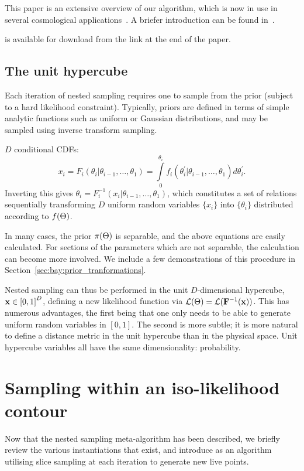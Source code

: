 This paper is an extensive overview of our algorithm, which is now in use in several cosmological applications~\citep{planck2015-a24}. A briefer introduction can be found in~\cite{polychordletter}.

\PolyChord{} is available for download from the link at the end of the paper.


\subsection{The unit hypercube}
\label{sec:bay:unit_hypercube}
Each iteration of nested sampling requires one to sample from the prior (subject to a hard likelihood constraint). 
Typically, priors are defined in terms of simple analytic functions such as uniform or Gaussian distributions, and may be sampled using  inverse transform sampling. 

$D$ conditional CDFs:
%
\begin{equation}
  x_i = F_i(\theta_i|\theta_{i-1},\ldots,\theta_1) = \int\limits_0^{\theta_i} f_i(\theta_i^\prime|\theta_{i-1},\ldots,\theta_1) d\theta_i^\prime.
\end{equation}
%
Inverting this gives $\theta_i = F^{-1}_i(x_i|\theta_{i-1},\ldots,\theta_1)$, which constitutes a set of relations sequentially transforming $D$ uniform random variables $\{x_i\}$ into $\{\theta_i\}$ distributed according to $f(\Theta)$.

In many cases, the prior $\pi(\Theta)$ is separable, and the above equations are easily calculated. For sections of the parameters which are not separable, the calculation can become more involved. We include a few demonstrations of this procedure in Section~\ref{sec:bay:prior_tranformations}.

Nested sampling can thus be performed in the unit $D$-dimensional hypercube, $\mathbf{x}\in {[0,1]}^D$, defining a new likelihood function via $\mathcal{L}(\Theta)= \mathcal{L}(\mathbf{F}^{-1}(\mathbf{x}))$. This has numerous advantages, the first being that one only needs to be able to generate uniform random variables in $[0,1]$. The second is more subtle; it is more natural to define a distance metric in the unit hypercube than in the physical space. Unit hypercube variables all have the same dimensionality: probability.












\section{Sampling within an iso-likelihood contour}
\label{sec:pc:iso_likelihood_sampling}
Now that the nested sampling meta-algorithm has been described, we briefly review the various instantiations that exist, and introduce \PolyChord{} as an algorithm utilising slice sampling at each iteration to generate new live points.

